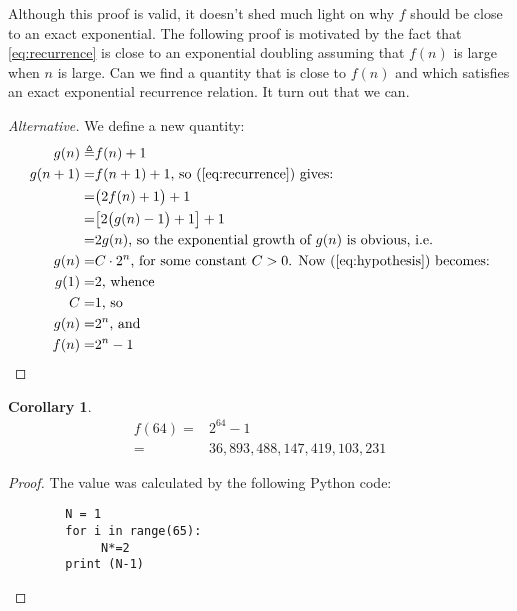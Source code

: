 \documentclass[]{article}
\newtheorem{cor}[thm]{Corollary}
\begin{document}
Although this proof is valid, it doesn't shed much light on why $f$ should be close to an exact exponential. The following proof is motivated by the fact that \ref{eq:recurrence} is close to an exponential doubling assuming that $f(n)$ is large when $n$ is large. Can we find a quantity that is close to $f(n)$ and which satisfies an exact exponential recurrence relation. It turn out that we can.
\begin{proof}[Alternative]
	We define a new quantity:
	\begin{align*}
		g(n)\triangleq& f(n) +1 \\
		g(n+1) = & f(n+1) +1 \text{, so (\ref{eq:recurrence}) gives:}\\
		=& \big(2f(n)+1\big)+1\\
		=& \big[2\big(g(n) -1\big) +1\big] +1\\
		=& 2 g(n) \text{, so the exponential growth of $g(n)$ is obvious, i.e.} \\
		g(n) =& C\cdot 2^n\text{, for some constant $C>0$. Now (\ref{eq:hypothesis}) becomes:}\\
		g(1) =&2\text{, whence}\\
		C=& 1 \text{, so}\\
		g(n) =& 2^n \text{, and} \\
		f(n) =& 2^n - 1
	\end{align*}
\end{proof}
\begin{cor}
	\begin{align*}
		f(64) =& 2^{64}-1\\
		=& 36,893,488,147,419,103,231
	\end{align*}
\end{cor}

\begin{proof}
	The value was calculated by the following Python code:
	\begin{verbatim}
		N = 1
		for i in range(65):
	 	     N*=2
		print (N-1)
	\end{verbatim}
\end{proof}


%
%
\end{document}
